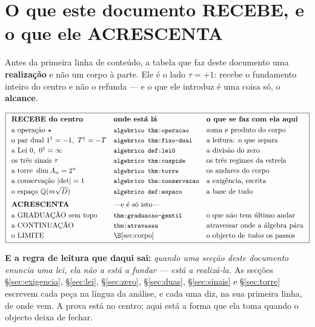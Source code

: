 \documentclass[11pt,a4paper]{article}
\newcommand{\code}[1]{\texttt{\small #1}}
\newcommand{\dg}{^{\dagger}}
\newcommand{\abs}[1]{\lvert #1\rvert}
\begin{document}
\section{O que este documento RECEBE, e o que ele ACRESCENTA}\label{sec:recebe}

Antes da primeira linha de conteúdo, a tabela que faz deste documento uma
\textbf{realização} e não um corpo à parte. Ele é o lado $\tau=+1$: recebe o fundamento
inteiro do centro e não o refunda --- e o que ele introduz é uma coisa só, o
\textbf{alcance}.

\[
\boxed{
\begin{array}{lll}
\textbf{RECEBE do centro} & \textbf{onde está lá} & \textbf{o que se faz com ela aqui}\\[3pt]
\text{a operação }\star & \code{algebrico thm:operacao} & \text{soma e produto do corpo}\\[2pt]
\text{o par dual } 1\dg=-1,\ T\dg=-T & \code{algebrico thm:fixo-dual} & \text{a leitura: o que separa}\\[2pt]
\text{a Lei 0},\ 0\dg=\infty & \code{algebrico def:lei0} & \text{a divisão do zero}\\[2pt]
\text{os três sinais }\tau & \code{algebrico thm:cuspide} & \text{os três regimes da estrela}\\[2pt]
\text{a torre } \dim A_n=2^n & \code{algebrico thm:torre} & \text{os andares do corpo}\\[2pt]
\text{a conservação }\abs{\det}=1 & \code{algebrico thm:conservacao} & \text{a exigência, escrita}\\[2pt]
\text{o espaço } \mathbb{Q}(m\sqrt D) & \code{algebrico def:espaco} & \text{a base de tudo}\\[6pt]
\textbf{ACRESCENTA} & \multicolumn{2}{l}{\text{---e é só isto---}}\\[3pt]
\text{a GRADUAÇÃO sem topo} & \code{thm:graduacao-gentil} & \text{o que não tem último andar}\\[2pt]
\text{a CONTINUAÇÃO} & \code{thm:atravessa} & \text{atravessar onde a álgebra pára}\\[2pt]
\text{o LIMITE} & \S\ref{sec:corpo} & \text{o objecto de \emph{todos} os passos}
\end{array}}
\]

\noindent\textbf{E a regra de leitura que daqui sai:} \emph{quando uma secção deste
documento enuncia uma lei, ela não a está a fundar --- está a realizá-la.} As secções
\S\ref{sec:exigencia}, \S\ref{sec:lei}, \S\ref{sec:zero}, \S\ref{sec:duas},
\S\ref{sec:sinais} e \S\ref{sec:torre} escrevem cada peça na língua da análise, e cada uma
diz, na sua primeira linha, de onde vem. A prova está no centro; aqui está a forma que ela
toma quando o objecto deixa de fechar.
\end{document}
